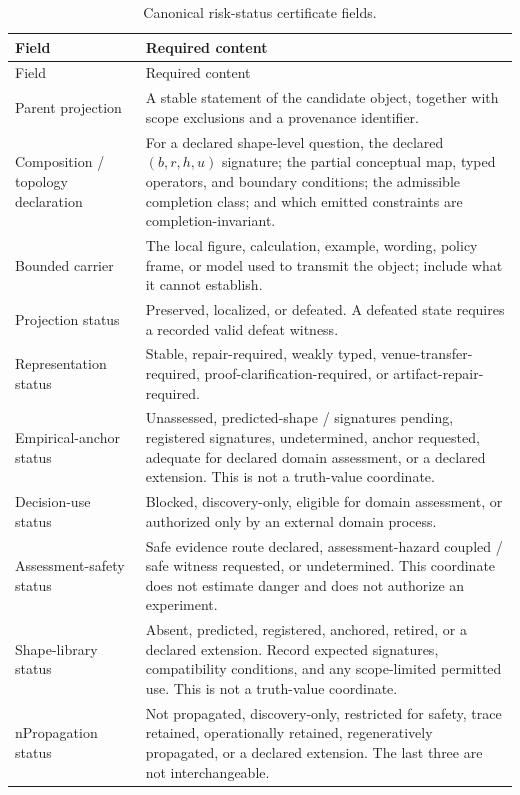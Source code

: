 \documentclass[10pt]{article}
\begin{document}
\begin{longtable}{@{}p{}p{}@{}}
\caption{Canonical risk-status certificate fields.}\label{tab:certificate-schema}\\
\toprule
Field & Required content \\
\midrule
\endfirsthead
\toprule
Field & Required content \\
\midrule
\endhead
\bottomrule
\endfoot
Parent projection & A stable statement of the candidate object, together with scope exclusions and a provenance identifier. \\
Composition / topology declaration & For a declared shape-level question, the declared $(b,r,h,u)$ signature; the partial conceptual map, typed operators, and boundary conditions; the admissible completion class; and which emitted constraints are completion-invariant. \\
Bounded carrier & The local figure, calculation, example, wording, policy frame, or model used to transmit the object; include what it cannot establish. \\
Projection status & Preserved, localized, or defeated. A defeated state requires a recorded valid defeat witness. \\
Representation status & Stable, repair-required, weakly typed, venue-transfer-required, proof-clarification-required, or artifact-repair-required. \\
Empirical-anchor status & Unassessed, predicted-shape / signatures pending, registered signatures, undetermined, anchor requested, adequate for declared domain assessment, or a declared extension. This is not a truth-value coordinate. \\
Decision-use status & Blocked, discovery-only, eligible for domain assessment, or authorized only by an external domain process. \\
Assessment-safety status & Safe evidence route declared, assessment-hazard coupled / safe witness requested, or undetermined. This coordinate does not estimate danger and does not authorize an experiment. \\
Shape-library status & Absent, predicted, registered, anchored, retired, or a declared extension. Record expected signatures, compatibility conditions, and any scope-limited permitted use. This is not a truth-value coordinate. \\nPropagation status & Not propagated, discovery-only, restricted for safety, trace retained, operationally retained, regeneratively propagated, or a declared extension. The last three are not interchangeable. \\

\end{longtable}
\end{document}
